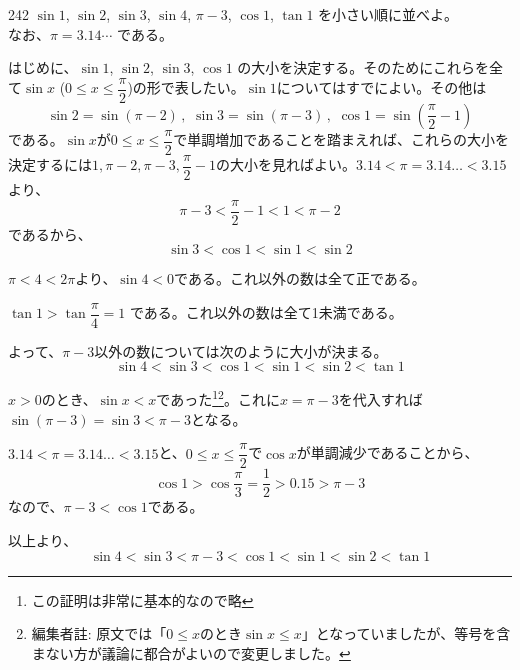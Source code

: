 \begin{prob}{242}{}{}
 $\sin 1$, $\sin 2$, $\sin 3$, $\sin 4$, $\pi-3$, $\cos 1$, $\tan 1$ を小さい順に並べよ。\\
 なお、$\pi=3.14\cdots$ である。
\end{prob}

はじめに、$\sin 1$, $\sin 2$, $\sin 3$, $\cos 1$ の大小を決定する。そのためにこれらを全て$\sin x$ ($0\le x\le \dfrac{\pi}{2}$)の形で表したい。$\sin 1$についてはすでによい。その他は
\[ \sin 2=\sin (\pi-2) \,,\,\, \sin 3=\sin (\pi-3) \,,\,\, \cos 1=\sin \left(\frac{\pi}{2}-1\right) \]
である。$\sin x$が$0\le x\le \dfrac{\pi}{2}$で単調増加であることを踏まえれば、これらの大小を決定するには$1, \pi-2, \pi-3, \dfrac{\pi}{2}-1$の大小を見ればよい。$3.14<\pi=3.14\dots <3.15$より、
\[ \pi-3 < \frac{\pi}{2}-1 < 1 < \pi-2 \]
であるから、
\[ \sin 3 < \cos 1 < \sin 1 < \sin 2 \]

$\pi < 4 < 2\pi$より、$\sin 4 < 0$である。これ以外の数は全て正である。

$\tan 1 > \tan\dfrac{\pi}{4}=1$ である。これ以外の数は全て1未満である。

よって、$\pi-3$以外の数については次のように大小が決まる。
\[ \sin 4 < \sin 3 < \cos 1 < \sin 1 < \sin 2 < \tan 1 \]

$x > 0$のとき、$\sin x < x$であった\footnote{この証明は非常に基本的なので略}\footnote{編集者註: 原文では「$0\le x$のとき$\sin x\le x$」となっていましたが、等号を含まない方が議論に都合がよいので変更しました。}。これに$x=\pi-3$を代入すれば$\sin (\pi-3)=\sin 3 < \pi -3$となる。

$3.14<\pi=3.14\dots <3.15$と、$0\le x\le \dfrac{\pi}{2}$で$\cos x$が単調減少であることから、
\[ \cos 1 > \cos \frac{\pi}{3}=\frac{1}{2} > 0.15 > \pi -3 \]
なので、$\pi -3 < \cos 1$である。

以上より、
\[ \sin 4 < \sin 3 < \pi -3 < \cos 1 < \sin 1 < \sin 2 < \tan 1 \]